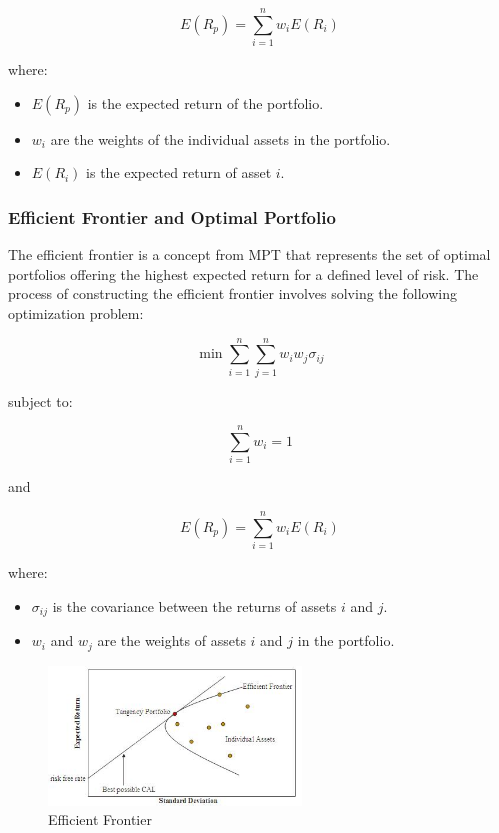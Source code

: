 \begin{equation}
E(R_p) = \sum_{i=1}^n w_iE(R_i)
\end{equation}

where:
\begin{itemize}
    \item $E(R_p)$ is the expected return of the portfolio.
    \item $w_i$ are the weights of the individual assets in the portfolio.
    \item $E(R_i)$ is the expected return of asset $i$.
\end{itemize}

\subsubsection{Efficient Frontier and Optimal Portfolio}
The efficient frontier is a concept from MPT that represents the set of optimal portfolios offering the highest expected return for a defined level of risk. The process of constructing the efficient frontier involves solving the following optimization problem:

\begin{equation}
\min \sum_{i=1}^n \sum_{j=1}^n w_i w_j \sigma_{ij}
\end{equation}

subject to:

\begin{equation}
\sum_{i=1}^n w_i = 1
\end{equation}

and

\begin{equation}
E(R_p) = \sum_{i=1}^n w_iE(R_i)
\end{equation}

where:
\begin{itemize}
    \item $\sigma_{ij}$ is the covariance between the returns of assets $i$ and $j$.
    \item $w_i$ and $w_j$ are the weights of assets $i$ and $j$ in the portfolio.
\end{itemize}

\begin{figure}[h!]
    \centering
    \includegraphics[width=0.6\textwidth]{../Figures/efficient_frontier.png}
    \caption{Efficient Frontier}
    \label{fig:efficient_frontier}
\end{figure}

